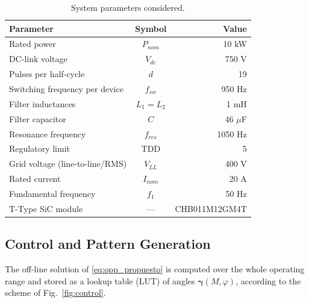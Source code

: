 \documentclass[conference]{IEEEtran}
\newcommand{\gv}{\boldsymbol{\gamma}}
\newcommand{\pct}{\text{\char`\%}}
\begin{document}
\begin{table}[!t]
    \centering
    \caption{System parameters considered.}
    \bgroup
    \def\arraystretch{1.0}
    \setlength{\tabcolsep}{4pt}
    \begin{tabular*}{\columnwidth}{@{\extracolsep{\fill}}lcr@{}}
        \toprule
        \rowcolor{Gray}
        Parameter & Symbol & Value \\ \midrule
        Rated power & $P_{nom}$ & 10 kW \\
        DC-link voltage & $V_{dc}$ & 750 V \\
        Pulses per half-cycle & $d$ & 19 \\
        Switching frequency per device & $f_{sw}$ & 950 Hz \\
        Filter inductances & $L_1 = L_2$ & 1 mH \\
        Filter capacitor & $C$ & 46 $\mu$F \\
        Resonance frequency & $f_{res}$ & 1050 Hz \\
        Regulatory limit & TDD & 5\pct{} \\
        Grid voltage (line-to-line/RMS) & $V_{LL}$ & 400 V \\
        Rated current & $I_{nom}$ & 20 A \\
        Fundamental frequency & $f_1$ & 50 Hz \\
        T-Type SiC module & --- & CHB011M12GM4T \\
        \bottomrule
    \end{tabular*}
    \egroup
    \label{tab:parametros}
\end{table}


\subsection{Control and Pattern Generation}
\label{sec:implementacion}

The off-line solution of \eqref{eq:opp_propuesto} is computed over the whole
operating range and stored as a lookup table (LUT) of angles $\gv(M, \varphi ) $,
according to the scheme of Fig.~\ref{fig:control}.
\end{document}
